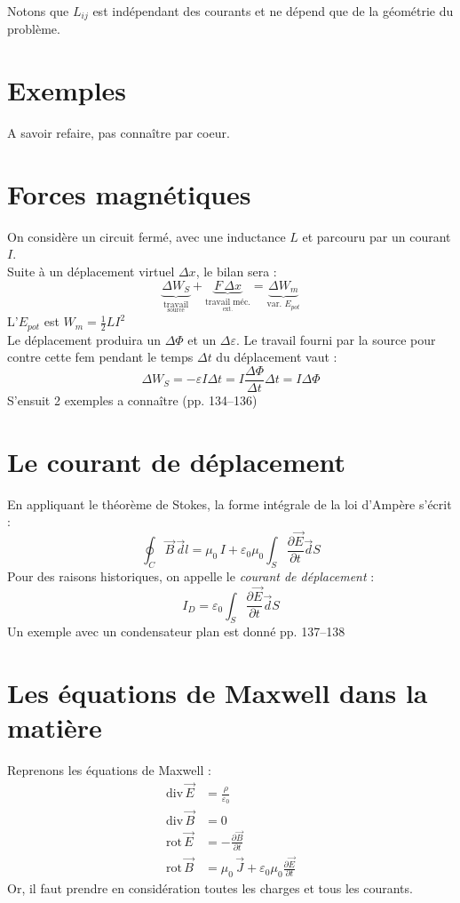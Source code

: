 \documentclass	[11pt, a4paper, openany]{book}
\newcommand{\rot}{\text{rot}\,}
\newcommand{\divv}{\text{div}\,}
\begin{document}
Notons que $L_{ij}$ est indépendant des courants et ne dépend que de la géométrie du problème. 
\section{Exemples}
A savoir refaire, pas connaître par coeur.
\section{Forces magnétiques}
On considère un circuit fermé, avec une inductance $L$ et parcouru par un courant $I$.\\Suite à un déplacement virtuel $\Delta x$, le bilan sera : \begin{equation}
\underbrace{\Delta W_S}_{\underset{\text{source}}{\text{travail}}}+\underbrace{F\,\Delta x}_{\underset{\text{ext.}}{\text{travail méc.}}}=\underbrace{\Delta W_m}_{\text{var. }E_{pot}}
\end{equation}
L'$E_{pot}$ est $W_m=\frac{1}{2}LI^2$\\ 
Le déplacement produira un $\Delta\Phi$ et un $\Delta\varepsilon$. Le travail fourni par la source pour contre cette fem pendant le temps $\Delta t$ du déplacement vaut : \begin{equation}
\Delta W_S=-\varepsilon I\Delta t=I\frac{\Delta\Phi}{\Delta t}\Delta t=I\Delta\Phi
\end{equation}
S'ensuit 2 exemples a connaître (pp. 134--136)
\section{Le courant de déplacement}
En appliquant le théorème de Stokes, la forme intégrale de la loi d'Ampère s'écrit :\begin{equation}
\oint_C\vec B\,\vec dl=\mu_0\,I+\varepsilon_0\mu_0\int_S\frac{\partial\vec E}{\partial t}\vec dS
\end{equation}
Pour des raisons historiques, on appelle le \textit{courant de déplacement} :\begin{equation}
I_D=\varepsilon_0\int_S\frac{\partial\vec E}{\partial t}\vec dS
\end{equation}
Un exemple avec un condensateur plan est donné pp. 137--138
\section{Les équations de Maxwell dans la matière}
Reprenons les équations de Maxwell : \begin{align}\label{eqmaxwell}
\divv\vec E & = \frac{\rho}{\varepsilon_0}\\
\divv\vec B & =0\\
\rot\vec E & =-\frac{\partial \vec B}{\partial t}\\
\label{eqampmax}
\rot\vec B & = \mu_0\,\vec J+\varepsilon_0\mu_0\frac{\partial \vec E}{\partial t}
\end{align}
Or, il faut prendre en considération toutes les charges et tous les courants.\\
\end{document}
